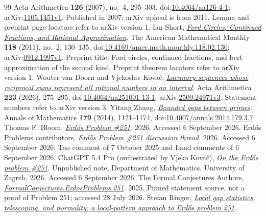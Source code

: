 \documentclass[11pt]{article}
\begin{document}
\begin{thebibliography}{99}
  Acta Arithmetica \textbf{126} (2007), no.~4, 295--303, doi:\href{https://doi.org/10.4064/aa126-4-1}{10.4064/aa126-4-1}; arXiv:\href{https://arxiv.org/abs/1105.1451v1}{1105.1451v1}. Published in 2007; arXiv upload is from 2011. Lemma and preprint page locators refer to arXiv version 1.
 Ian Short, \href{https://arxiv.org/abs/0912.1997v1}{\emph{Ford Circles, Continued Fractions, and Rational Approximation}}.
  The American Mathematical Monthly \textbf{118} (2011), no.~2, 130--135, doi:\href{https://doi.org/10.4169/amer.math.monthly.118.02.130}{10.4169/amer.math.monthly.118.02.130}; arXiv:\href{https://arxiv.org/abs/0912.1997v1}{0912.1997v1}. Preprint title: Ford circles, continued fractions, and best approximation of the second kind. Preprint theorem locators refer to arXiv version 1.
 Wouter van Doorn and Vjekoslav Kova\v{c}, \href{https://arxiv.org/abs/2509.24971v3}{\emph{Lacunary sequences whose reciprocal sums represent all rational numbers in an interval}}.
  Acta Arithmetica \textbf{223} (2026), 275--295, doi:\href{https://doi.org/10.4064/aa251001-13-1}{10.4064/aa251001-13-1}; arXiv:\href{https://arxiv.org/abs/2509.24971v3}{2509.24971v3}. Statement numbers refer to arXiv version 3.
 Yitang Zhang, \href{https://doi.org/10.4007/annals.2014.179.3.7}{\emph{Bounded gaps between primes}}.
  Annals of Mathematics \textbf{179} (2014), 1121--1174, doi:\href{https://doi.org/10.4007/annals.2014.179.3.7}{10.4007/annals.2014.179.3.7}.
 Thomas F. Bloom, \href{https://www.erdosproblems.com/251}{\emph{Erd\H{o}s Problem \#251}}.
  2026. Accessed 6 September 2026.
 {Erdős Problems contributors}, \href{https://www.erdosproblems.com/forum/thread/251}{\emph{Erd\H{o}s Problem \#251 discussion thread}}.
  2026. Accessed 6 September 2026: Tao comment of 7 October 2025 and Land comments of 6 September 2026.
 {ChatGPT 5.4 Pro (orchestrated by Vjeko Kova\v{c})}, \href{https://web.math.pmf.unizg.hr/~vjekovac/files/Erdos_problem_251.pdf}{\emph{On the Erd\H{o}s problem \#251}}.
  Unpublished note, Department of Mathematics, University of Zagreb, 2026. Accessed 6 September 2026.
 {The Formal Conjectures Authors}, \href{https://github.com/google-deepmind/formal-conjectures/blob/f776d2f2039351b00737ffcafb9d7d7666e1d9af/FormalConjectures/ErdosProblems/251.lean}{\emph{FormalConjectures.ErdosProblems.251}}.
  2025. Pinned statement source, not a proof of Problem 251; accessed 28 July 2026.
 Stefan Ringer, \href{https://github.com/StefanRinger/erdos-251}{\emph{Local gap statistics, telescoping, and normality: a local-pattern approach to Erd\H{o}s problem 251}}.

\end{thebibliography}
\end{document}

